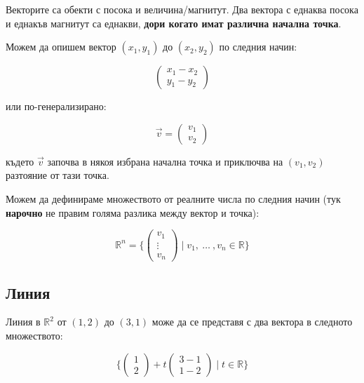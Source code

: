 \documentclass[12pt]{article}
\begin{document}
\noindent Векторите са обекти с посока и величина/магнитут. Два вектора с еднаква посока и еднакъв магнитут са еднакви, \textbf{дори когато имат различна начална точка}.

\noindent Можем да опишем вектор $ (x_{1}, y_{1}) $ до $ (x_{2}, y_{2}) $ по следния начин:

\begin{equation*}
    \left(\begin{array}{ c }x_{1} - x_{2} \\ y_{1} - y_{2} \end{array}\right)
\end{equation*}

\noindent или по-генерализирано:

\begin{equation*}
    \overrightarrow{v} = \left(\begin{array}{ c }v_{1} \\ v_{2} \end{array}\right)
\end{equation*}

\noindent където $ \overrightarrow{v} $ започва в някоя избрана начална точка и приключва на $ (v_{1}, v_{2}) $ разтояние от тази точка.

\noindent Можем да дефинираме множеството от реалните числа по следния начин (тук \textbf{нарочно} не правим голяма разлика между вектор и точка):

\begin{equation*}
    \mathbb{R}^{n} = \{ \left(\begin{array}{ c }v_{1} \\ \vdots \\ v_{n} \end{array}\right) \mid v_{1},\ \ldots\ , v_{n} \in \mathbb{R} \}
\end{equation*}

\subsection{Линия}

\noindent Линия в $ \mathbb{R}^2 $ от $ (1, 2) $ до $ (3, 1) $ може да се представя с два вектора в следното множеството:

\begin{equation*}
    \{ \left(\begin{array}{ c } 1 \\ 2 \end{array}\right) + t \left(\begin{array}{ c } 3 - 1 \\ 1 - 2 \end{array}\right) \mid t \in \mathbb{R} \}
\end{equation*}
\end{document}
